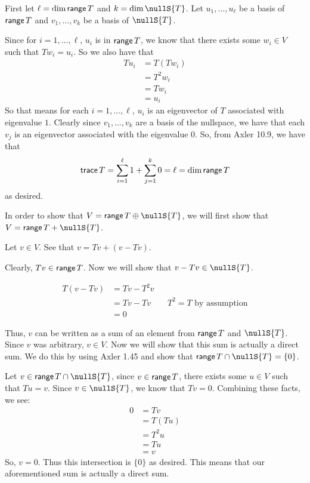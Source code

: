 \documentclass[answers]{exam}
\begin{document}
\begin{questions}
\begin{parts}
\begin{solution}
            First let $\ell = \text{dim}\,{\mathsf{range}\,{T}}$ and $k=\dim{\nullS{T}}$. 
            Let $u_1,\dots,u_\ell$ be a basis of $\mathsf{range}\,{T}$ and $v_1,\dots,v_k$ be a basis of $\nullS{T}$.

            Since for $i = 1,\dots,\ell$, $u_i$ is in $\mathsf{range}\,{T}$, we know that there exists some $w_i\in V$
            such that $Tw_i = u_i$. So we also have that
            \begin{align*}
                Tu_i &= T(Tw_i) \\
                &= T^2w_i \\
                &= Tw_i \\
                &= u_i
            \end{align*}
            So that means for each $i=1,\dots,\ell$, $u_i$ is an eigenvector of $T$ associated with eigenvalue
            $1$. Clearly since $v_1,\dots,v_k$ are a basis of the nullspace, we have that each $v_j$ is an
            eigenvector associated with the eigenvalue $0$. So, from Axler 10.9, we have that
            $$\mathsf{trace}\,{T} = \sum_{i=1}^\ell 1 + \sum_{j=1}^k 0 = \ell = \text{dim}\,{\mathsf{range}\,{T}}$$
            as desired.


            In order to show that $V = \range{T} \oplus \nullS{T}$, we will first show that 
            $V = \range{T} + \nullS{T}$. 

            Let $v\in V$. See that $v = Tv + (v - Tv)$. 

            Clearly, $Tv\in\mathsf{range}\,{T}$. Now we will show that $v-Tv\in\nullS{T}$.

            \begin{align*}
                T(v-Tv) &= Tv - T^2v \\
                &= Tv - Tv \qquad\text{$T^2=T$ by assumption}\\
                &= 0
            \end{align*}

            Thus, $v$ can be written as a sum of an element from $\mathsf{range}\,{T}$ and $\nullS{T}$. Since $v$ was
            arbitrary, $v\in V$. Now we will show that this sum is actually a direct sum. We do this by using 
            Axler 1.45 and show that $\range{T}\cap\nullS{T} = \{0\}$.

            Let $v\in\range{T}\cap\nullS{T}$, since $v\in\mathsf{range}\,{T}$, there exists some $u\in V$ such that 
            $Tu = v$. Since $v\in\nullS{T}$, we know that $Tv=0$. Combining these facts, we see:
            \begin{align*}
                0 &= Tv  \\
                &= T(Tu) \\
                &= T^2u  \\
                &= Tu    \\
                &= v
            \end{align*}
            So, $v=0$. Thus this intersection is $\{0\}$ as desired. This means that our aforementioned sum
            is actually a direct sum.


\end{solution}
\end{parts}
\end{questions}
\end{document}
